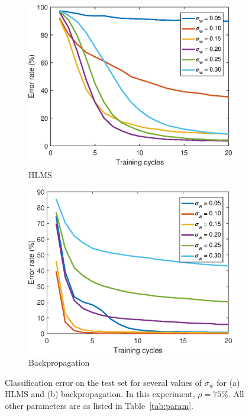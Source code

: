 \documentclass[a4paper]{article}
\begin{document}
\FloatBarrier
\begin{figure}[h!]
	\centering
	\begin{subfigure}[h!]{0.75\textwidth}
		\includegraphics[width=\textwidth]{figs/w0_hlms.eps}
		\caption{HLMS}
	\end{subfigure}%

	\begin{subfigure}[h!]{0.75\textwidth}
		\includegraphics[width=\textwidth]{w0_bp.eps}
		\caption{Backpropagation}
	\end{subfigure}
	\caption{Classification error on the test set for several values of $\sigma_w$ for (a) HLMS and (b) backpropagation. In this experiment, $\rho = 75\%$. All other parameters are as listed in Table~\ref{tab:param}.} \label{fig:w0}
\end{figure}
\FloatBarrier
\end{document}
